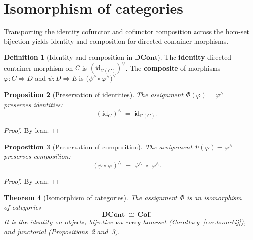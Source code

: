 \documentclass[11pt,a4paper]{article}
\theoremstyle{plain}
\newtheorem{theorem}{Theorem}[section]
\newtheorem{proposition}[theorem]{Proposition}
\theoremstyle{definition}
\newtheorem{definition}[theorem]{Definition}
\newcommand{\id}{\mathrm{id}}
\newcommand{\cat}{\mathcal{C}}
\newcommand{\DCont}{\mathbf{DCont}}
\newcommand{\Cof}{\mathbf{Cof}}
\begin{document}
\section{Isomorphism of categories}

Transporting the identity cofunctor and cofunctor composition across the
hom-set bijection yields identity and composition for directed-container
morphisms.

\begin{definition}[Identity and composition in $\DCont$]\label{def:dcont-ops}
The \textbf{identity} directed-container morphism on $C$ is
$(\id_{\cat(C)})^\vee$. The \textbf{composite} of morphisms
$\varphi:C\Rightarrow D$ and $\psi:D\Rightarrow E$ is
$\bigl(\psi^\wedge\circ\varphi^\wedge\bigr)^\vee$.
\end{definition}

\begin{proposition}[Preservation of identities]\label{prop:phi-id}
The assignment $\Phi(\varphi)=\varphi^\wedge$ preserves identities:
\begin{equation}
  (\id_C)^\wedge \;=\; \id_{\cat(C)}.
\end{equation}
\end{proposition}

\begin{proof}
By lean.
\end{proof}

\begin{proposition}[Preservation of composition]\label{prop:phi-comp}
The assignment $\Phi(\varphi)=\varphi^\wedge$ preserves composition:
\begin{equation}
  (\psi\circ\varphi)^\wedge
  \;=\;
  \psi^\wedge \;\circ\; \varphi^\wedge.
\end{equation}
\end{proposition}

\begin{proof}
By lean.
\end{proof}

\begin{theorem}[Isomorphism of categories]\label{thm:iso-cats}
The assignment $\Phi$ is an isomorphism of categories
\begin{equation}
  \DCont \;\cong\; \Cof.
\end{equation}
It is the identity on objects, bijective on every hom-set
(Corollary~\ref{cor:hom-bij}), and functorial
(Propositions~\ref{prop:phi-id} and~\ref{prop:phi-comp}).
\end{theorem}
\end{document}
